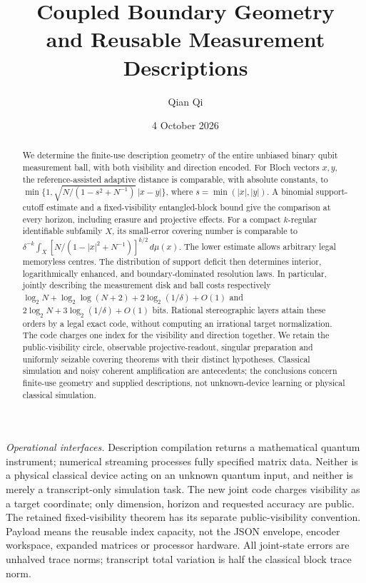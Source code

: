 \documentclass[11pt]{amsart}
\title[Coupled boundary geometry]{Coupled Boundary Geometry\\and Reusable Measurement Descriptions}
\author{Qian Qi}
\date{4 October 2026}
\numberwithin{equation}{section}
\theoremstyle{definition}\newtheorem{definition}[theorem]{Definition}
\theoremstyle{remark}\newtheorem{remark}[theorem]{Remark}
\begin{document}
\raggedbottom
\begin{abstract}
We determine the finite-use description geometry of the entire unbiased
binary qubit measurement ball, with both visibility and direction encoded.
For Bloch vectors $x,y$, the reference-assisted adaptive distance is
comparable, with absolute constants, to
$\min\{1,\sqrt{N/(1-s^2+N^{-1})}\,|x-y|\}$, where
$s=\min(|x|,|y|)$. A binomial support-cutoff estimate and a
fixed-visibility entangled-block bound give the comparison at every
horizon, including erasure and projective effects. For a compact
$k$-regular identifiable subfamily $X$, its small-error covering number
is comparable to
$\delta^{-k}\int_X[N/(1-|x|^2+N^{-1})]^{k/2}\,d\mu(x)$.
The lower estimate allows arbitrary legal memoryless centres.
The distribution of support deficit then determines interior,
logarithmically enhanced, and boundary-dominated resolution laws.
In particular, jointly describing the measurement disk and ball costs
respectively $\log_2N+\log_2\log(N+2)+2\log_2(1/\delta)+O(1)$ and
$2\log_2N+3\log_2(1/\delta)+O(1)$ bits.
Rational stereographic layers attain these orders by a legal exact code,
without computing an irrational target normalization. The code charges
one index for the visibility and direction together. We retain the
public-visibility circle, observable projective-readout, singular
preparation and uniformly seizable covering theorems with their distinct
hypotheses. Classical simulation and noisy coherent amplification are
antecedents; the conclusions concern finite-use geometry and supplied
descriptions, not unknown-device learning or physical classical simulation.
\end{abstract}
\maketitle
\noindent\textit{Operational interfaces.}
Description compilation returns a mathematical quantum instrument;
numerical streaming processes fully specified matrix data. Neither is a
physical classical device acting on an unknown quantum input, and
neither is merely a transcript-only simulation task. The new joint code charges visibility as a target coordinate;
only dimension, horizon and requested accuracy are public. The retained
fixed-visibility theorem has its separate public-visibility convention.
Payload means the reusable index capacity, not the JSON envelope,
encoder workspace, expanded matrices or processor hardware.
All joint-state errors
are unhalved trace norms; transcript total variation is half the classical
block trace norm.


















\end{document}
